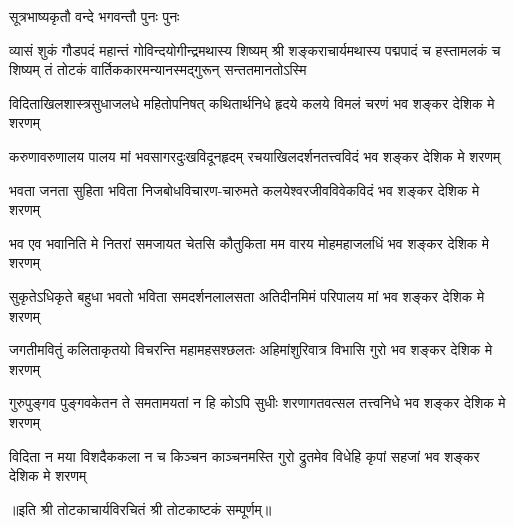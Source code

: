 

%
{सूत्रभाष्यकृतौ वन्दे भगवन्तौ पुनः पुनः}%

%
{व्यासं शुकं गौडपदं महान्तं गोविन्दयोगीन्द्रमथास्य शिष्यम्}%
{श्री शङ्कराचार्यमथास्य पद्मपादं च हस्तामलकं च शिष्यम्}%
{तं तोटकं वार्तिककारमन्यानस्मद्गुरून् सन्ततमानतोऽस्मि}%

\twolineshloka
{विदिताखिलशास्त्रसुधाजलधे महितोपनिषत् कथितार्थनिधे}%
{हृदये कलये विमलं चरणं भव शङ्कर देशिक मे शरणम्}%


\twolineshloka
{करुणावरुणालय पालय मां भवसागरदुःखविदूनहृदम्}%
{रचयाखिलदर्शनतत्त्वविदं भव शङ्कर देशिक मे शरणम्}%


\twolineshloka
{भवता जनता सुहिता भविता निजबोधविचारण-चारुमते}%
{कलयेश्वरजीवविवेकविदं भव शङ्कर देशिक मे शरणम्}%


\twolineshloka
{भव एव भवानिति मे नितरां समजायत चेतसि कौतुकिता}%
{मम वारय मोहमहाजलधिं भव शङ्कर देशिक मे शरणम्}%


\twolineshloka
{सुकृतेऽधिकृते बहुधा भवतो भविता समदर्शनलालसता}%
{अतिदीनमिमं परिपालय मां भव शङ्कर देशिक मे शरणम्}%


\twolineshloka
{जगतीमवितुं कलिताकृतयो विचरन्ति महामहसश्छलतः}%
{अहिमांशुरिवात्र विभासि गुरो भव शङ्कर देशिक मे शरणम्}%


\twolineshloka
{गुरुपुङ्गव पुङ्गवकेतन ते समतामयतां न हि कोऽपि सुधीः}%
{शरणागतवत्सल तत्त्वनिधे भव शङ्कर देशिक मे शरणम्}%


\twolineshloka
{विदिता न मया विशदैककला न च किञ्चन काञ्चनमस्ति गुरो}%
{द्रुतमेव विधेहि कृपां सहजां भव शङ्कर देशिक मे शरणम्}%

॥इति श्री तोटकाचार्यविरचितं श्री तोटकाष्टकं सम्पूर्णम्॥